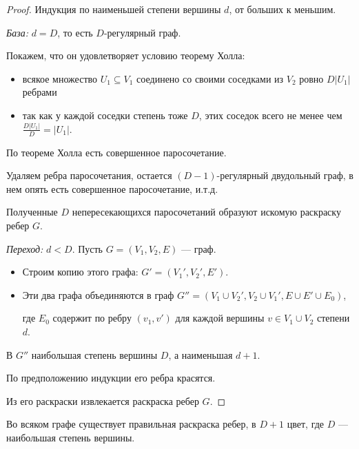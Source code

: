 \begin{proof}

    Индукция по наименьшей степени вершины $d$, от больших к меньшим.

    \textsl{База:} $d = D$, то есть $D$-регулярный граф.

    Покажем, что он удовлетворяет условию теорему Холла:
    \begin{itemize}
        \item всякое множество $U_1 \subseteq V_1$ соединено со своими соседками из $V_2$ ровно $D|U_1|$ ребрами
        
        \item так как у каждой соседки степень тоже $D$, этих соседок всего не менее чем $\frac{D|U_1|}{D} = |U_1|$.
    \end{itemize}

    По теореме Холла есть совершенное паросочетание.

    Удаляем ребра паросочетания, остается $(D - 1)$-регулярный двудольный граф, в нем опять есть совершенное паросочетание, и.т.д.

    Полученные $D$ непересекающихся паросочетаний образуют искомую раскраску ребер $G$.

    \textsl{Переход:} $d < D$. Пусть $G = (V_1, V_2, E)$ --- граф.

    \begin{itemize}
        \item Строим копию этого графа: $G' = (V_1', V_2', E')$.
        
        \item Эти два графа объединяются в граф $G'' = (V_1 \cup V_2', V_2 \cup V_1', E \cup E' \cup E_0)$,
        
        где $E_0$ содержит по ребру $(v_1, v')$ для каждой вершины $v \in V_1 \cup V_2$ степени $d$.
    \end{itemize}
    
    В $G''$ наибольшая степень вершины $D$, а наименьшая $d+1$.
    
    По предположению индукции его ребра красятся.
    
    Из его раскраски извлекается раскраска ребер $G$.
\end{proof}

\begin{theorem}[Визинг, 1964]
    Во всяком графе существует правильная раскраска ребер, в $D + 1$ цвет, где $D$ --- наибольшая степень вершины.
\end{theorem}

